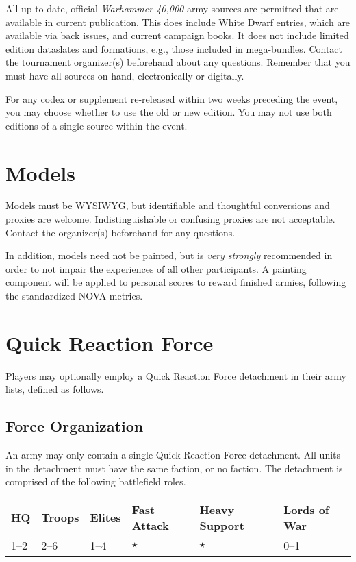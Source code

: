 All up-to-date, official \textit{Warhammer 40,000} army sources are
permitted that are available in current publication. This does include
White Dwarf entries, which are available via back issues, and current
campaign books. It does not include limited edition dataslates and
formations, e.g., those included in mega-bundles. Contact the
tournament organizer(s) beforehand about any questions. Remember that
you must have all sources on hand, electronically or digitally.

For any codex or supplement re-released within two weeks preceding the
event, you may choose whether to use the old or new edition. You may
not use both editions of a single source within the event.

\section{Models}

Models must be WYSIWYG, but identifiable and thoughtful conversions
and proxies are welcome. Indistinguishable or confusing proxies are
not acceptable.  Contact the organizer(s) beforehand for any
questions.

In addition, models need not be painted, but is \textit{very strongly}
recommended in order to not impair the experiences of all other
participants.  A painting component will be applied to personal scores
to reward finished armies, following the standardized NOVA metrics.


\clearpage
\section{Quick Reaction Force}

Players may optionally employ a Quick Reaction Force detachment in
their army lists, defined as follows.

\subsection{Force Organization}

An army may only contain a single Quick Reaction Force detachment.
All units in the detachment must have the same faction, or no faction.
The detachment is comprised of the following battlefield roles.

\begin{center}
\begin{tabular}{C{0.75in}C{0.75in}C{0.75in}C{0.75in}C{0.75in}C{0.75in}}
\textbf{\color{white} HQ}	& \textbf{\color{white} Troops}	& \textbf{\color{white} Elites}	& \textbf{\color{white} Fast Attack}	& \textbf{\color{white} Heavy Support}	& \textbf{\color{white} Lords of War}\\
1--2	& 2--6	& 1--4	& $\star$	& $\star$	& 0--1\\
\end{tabular}
\end{center}

